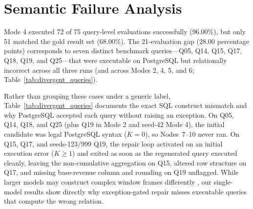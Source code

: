 \section{Semantic Failure Analysis}
\label{sec:semantic}
Mode 4 executed 72 of 75 query-level evaluations successfully (96.00\%), but only 51 matched the gold result set (68.00\%). The 21-evaluation gap (28.00 percentage points) corresponds to seven distinct benchmark queries---Q05, Q14, Q15, Q17, Q18, Q19, and Q25---that were executable on PostgreSQL but relationally incorrect across all three runs (and across Modes 2, 4, 5, and 6; Table~\ref{tab:divergent_queries}).

Rather than grouping these cases under a generic label, Table~\ref{tab:divergent_queries} documents the exact SQL construct mismatch and why PostgreSQL accepted each query without raising an exception. On Q05, Q14, Q18, and Q25 (plus Q19 in Mode 2 and seed-42 Mode 4), the initial candidate was legal PostgreSQL syntax ($K=0$), so Nodes~7--10 never ran. On Q15, Q17, and seeds-123/999 Q19, the repair loop activated on an initial execution error ($K \ge 1$) and exited as soon as the regenerated query executed cleanly, leaving the non-cumulative aggregation on Q15, altered row structure on Q17, and missing base-revenue column and rounding on Q19 unflagged. While larger models may construct complex window frames differently \cite{wei2022emergent}, our single-model results show directly why exception-gated repair misses executable queries that compute the wrong relation.

